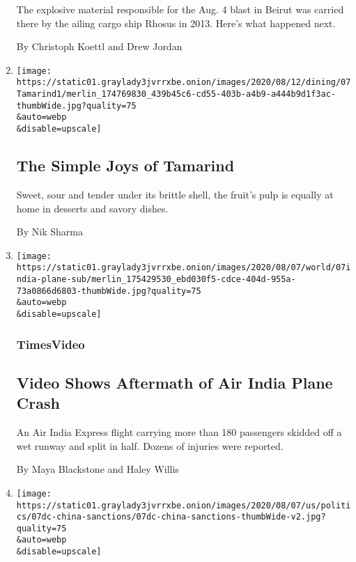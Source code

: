 \begin{enumerate}
  The explosive material responsible for the Aug. 4 blast in Beirut was
  carried there by the ailing cargo ship Rhosus in 2013. Here's what
  happened next.

  By Christoph Koettl and Drew Jordan
\item
  \href{/2020/08/07/dining/tamarind-recipes.html}{}

  \texttt{[image: https://static01.graylady3jvrrxbe.onion/images/2020/08/12/dining/07Tamarind1/merlin\_174769830\_439b45c6-cd55-403b-a4b9-a444b9d1f3ac-thumbWide.jpg?quality=75\\\&auto=webp\\\&disable=upscale]}

  \hypertarget{the-simple-joys-of-tamarind}{%
  \subsection{The Simple Joys of
  Tamarind}\label{the-simple-joys-of-tamarind}}

  Sweet, sour and tender under its brittle shell, the fruit's pulp is
  equally at home in desserts and savory dishes.

  By Nik Sharma
\item
  \href{/video/world/100000007278318/air-india-plane-crash-video.html}{}

  \texttt{[image: https://static01.graylady3jvrrxbe.onion/images/2020/08/07/world/07india-plane-sub/merlin\_175429530\_ebd030f5-cdce-404d-955a-73a0866d6803-thumbWide.jpg?quality=75\\\&auto=webp\\\&disable=upscale]}

  \hypertarget{timesvideo}{%
  \subsubsection{TimesVideo}\label{timesvideo}}

  \hypertarget{video-shows-aftermath-of-air-india-plane-crash}{%
  \subsection{Video Shows Aftermath of Air India Plane
  Crash}\label{video-shows-aftermath-of-air-india-plane-crash}}

  An Air India Express flight carrying more than 180 passengers skidded
  off a wet runway and split in half. Dozens of injuries were reported.

  By Maya Blackstone and Haley Willis
\item
  \href{/2020/08/07/world/asia/trump-china-hong-kong-sanctions.html}{}

  \texttt{[image: https://static01.graylady3jvrrxbe.onion/images/2020/08/07/us/politics/07dc-china-sanctions/07dc-china-sanctions-thumbWide-v2.jpg?quality=75\\\&auto=webp\\\&disable=upscale]}


\end{enumerate}
